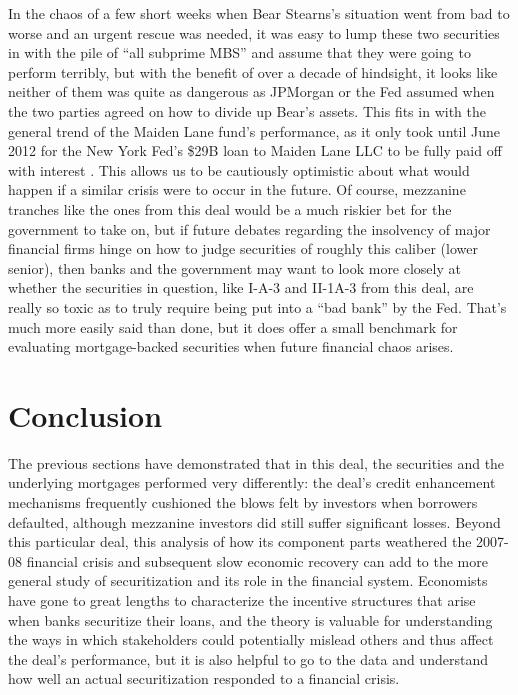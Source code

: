 \documentclass[12pt]{article}
\begin{document}
In the chaos of a few short weeks when Bear Stearns’s situation went from bad to worse and an urgent rescue was needed, it was easy to lump these two securities in with the pile of “all subprime MBS” and assume that they were going to perform terribly, but with the benefit of over a decade of hindsight, it looks like neither of them was quite as dangerous as JPMorgan or the Fed assumed when the two parties agreed on how to divide up Bear’s assets. This fits in with the general trend of the Maiden Lane fund’s performance, as it only took until June 2012 for the New York Fed’s \$29B loan to Maiden Lane LLC to be fully paid off with interest \parencite{schaefer12}. This allows us to be cautiously optimistic about what would happen if a similar crisis were to occur in the future. Of course, mezzanine tranches like the ones from this deal would be a much riskier bet for the government to take on, but if future debates regarding the insolvency of major financial firms hinge on how to judge securities of roughly this caliber (lower senior), then banks and the government may want to look more closely at whether the securities in question, like I-A-3 and II-1A-3 from this deal, are really so toxic as to truly require being put into a “bad bank” by the Fed. That’s much more easily said than done, but it does offer a small benchmark for evaluating mortgage-backed securities when future financial chaos arises.

\section*{Conclusion}
The previous sections have demonstrated that in this deal, the securities and the underlying mortgages performed very differently: the deal's credit enhancement mechanisms frequently cushioned the blows felt by investors when borrowers defaulted, although mezzanine investors did still suffer significant losses. Beyond this particular deal, this analysis of how its component parts weathered the 2007-08 financial crisis and subsequent slow economic recovery can add to the more general study of securitization and its role in the financial system. Economists have gone to great lengths to characterize the incentive structures that arise when banks securitize their loans, and the theory is valuable for understanding the ways in which stakeholders could potentially mislead others and thus affect the deal’s performance, but it is also helpful to go to the data and understand how well an actual securitization responded to a financial crisis.
\end{document}

